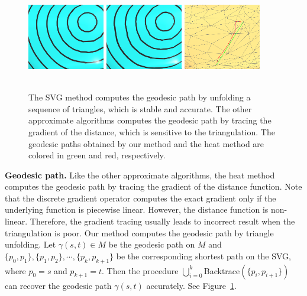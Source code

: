 \begin{figure}[htbp]
\centering
\includegraphics[width=0.3\textwidth]{figs/svg/path/exactfield3}
\includegraphics[width=0.3\textwidth]{figs/svg/path/heatfield3}
\includegraphics[width=0.3\textwidth]{figs/svg/path/pathtracing3}\\
  \\
\vspace{-0.1in} \caption{The SVG method computes the geodesic path
by unfolding a sequence of triangles, which is stable and accurate.
The other approximate algorithms computes the geodesic path by
tracing the gradient of the distance, which is sensitive to the
triangulation. The geodesic paths obtained by our method and the
heat method are colored in green and red,
respectively.}\label{fig:path}
\end{figure}

\noindent\textbf{Geodesic path.} Like the other approximate
algorithms, the heat method computes the geodesic path by tracing
the gradient of the distance function. Note that the discrete
gradient operator computes the exact gradient only if the underlying
function is piecewise linear. However, the distance function is
non-linear. Therefore, the gradient tracing usually leads to
incorrect result when the triangulation is poor. Our method computes
the geodesic path by triangle unfolding. Let $\gamma(s,t) \in M$ be
the geodesic path on $M$ and $\{p_0,p_1\}, \{p_1,p_2\}, \cdots,
\{p_k,p_{k+1}\}$ be the corresponding shortest path on the SVG,
where $p_0=s$ and $p_{k+1}=t$. Then the procedure
$\bigcup_{i=0}^{k}$Backtrace$(\{p_i,p_{i+1}\})$ can recover the
geodesic path $\gamma(s,t)$ accurately. See Figure~\ref{fig:path}.

